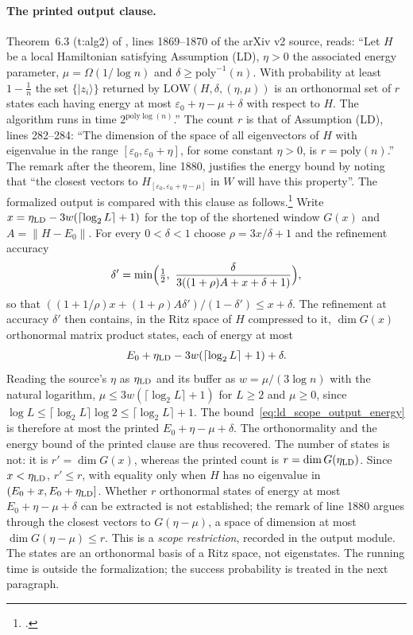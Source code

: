 \documentclass{article}
\begin{document}
\paragraph{The printed output clause.}
Theorem~6.3 (t:alg2) of \cite{Arad2016RigorousRG}, lines 1869--1870 of the
arXiv v2 source, reads: ``Let $H$ be a local Hamiltonian satisfying
Assumption (LD), $\eta>0$ the associated energy parameter,
$\mu=\Omega(1/\log n)$ and $\delta\ge\mathrm{poly}^{-1}(n)$. With probability at
least $1-\frac1n$ the set $\{|z_i\rangle\}$ returned by
$\mathrm{LOW}(H,\delta,(\eta,\mu))$ is an orthonormal set of $r$ states each
having energy at most $\varepsilon_0+\eta-\mu+\delta$ with respect to $H$. The
algorithm runs in time $2^{\mathrm{poly}\log(n)}$.'' The count $r$ is that of
Assumption (LD), lines 282--284: ``The dimension of the space of all
eigenvectors of $H$ with eigenvalue in the range
$[\varepsilon_0,\varepsilon_0+\eta]$, for some constant $\eta>0$, is
$r=\mathrm{poly}(n)$.'' The remark after the theorem, line 1880, justifies the
energy bound by noting that ``the closest vectors to
$H_{[\varepsilon_0,\varepsilon_0+\eta-\mu]}$ in $W$ will have this property''.
The formalized output is compared with this clause as
follows.\footnote{.}
Write $x=\eta_{\rm LD}-3w(\lceil\log_2L\rceil+1)$ for the top of the shortened
window $G(x)$ and $A=\|H-E_0\|$. For every $0<\delta<1$ choose
$\rho=3x/\delta+1$ and the refinement accuracy
\begin{align}
    \delta'=\min\Bigl(\tfrac12,\ \frac{\delta}{3((1+\rho)A+x+\delta+1)}\Bigr),
    \label{eq:ld_scope_output_accuracy}
\end{align}
so that $((1+1/\rho)x+(1+\rho)A\delta')/(1-\delta')\le x+\delta$. The
refinement at accuracy $\delta'$ then contains, in the Ritz space of $H$
compressed to it, $\dim G(x)$ orthonormal matrix product states, each of
energy at most
\begin{align}
    E_0+\eta_{\rm LD}-3w(\lceil\log_2L\rceil+1)+\delta.
    \label{eq:ld_scope_output_energy}
\end{align}
Reading the source's $\eta$ as $\eta_{\rm LD}$ and its buffer as
$w=\mu/(3\log n)$ with the natural logarithm, $\mu\le3w(\lceil\log_2L\rceil+1)$
for $L\ge2$ and $\mu\ge0$, since
$\log L\le\lceil\log_2L\rceil\log2\le\lceil\log_2L\rceil+1$. The
bound~\eqref{eq:ld_scope_output_energy} is therefore at most the printed
$E_0+\eta-\mu+\delta$. The orthonormality and the energy bound of the printed
clause are thus recovered. The number of states is not: it is
$r'=\dim G(x)$, whereas the printed count is $r=\dim G(\eta_{\rm LD})$. Since
$x<\eta_{\rm LD}$, $r'\le r$, with equality only when $H$ has no eigenvalue in
$(E_0+x,E_0+\eta_{\rm LD}]$. Whether $r$ orthonormal states of energy at most
$E_0+\eta-\mu+\delta$ can be extracted is not established; the remark of
line 1880 argues through the closest vectors to $G(\eta-\mu)$, a space of
dimension at most $\dim G(\eta-\mu)\le r$. This
is a \emph{scope restriction}, recorded in the output module. The states are
an orthonormal basis of a Ritz space, not eigenstates. The running time is
outside the formalization; the success
probability is treated in the next paragraph.
\end{document}
